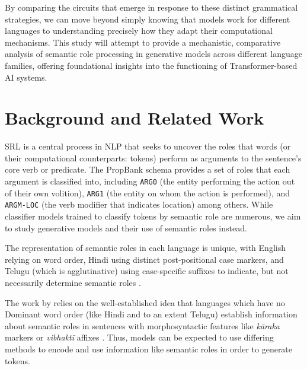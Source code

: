 \documentclass[11pt]{article}
\begin{document}
By comparing the circuits that emerge in response to these distinct grammatical strategies, we can move beyond simply knowing that models work for different languages to understanding precisely how they adapt their computational mechanisms. This study will attempt to provide a mechanistic, comparative analysis of semantic role processing in generative models across different language families, offering foundational insights into the functioning of Transformer-based AI systems.
\section*{Background and Related Work}
\label{sec:org4aa9f51}

SRL is a central process in NLP that seeks to uncover the roles that words (or their computational counterparts: tokens) perform as arguments to the sentence's core verb or predicate. The PropBank \citep{10.1162/0891201053630264} schema provides a set of roles that each argument is classified into, including \texttt{ARG0} (the entity performing the action out of their own volition), \texttt{ARG1} (the entity on whom the action is performed), and \texttt{ARGM-LOC} (the verb modifier that indicates location) among others. While classifier models trained to classify tokens by semantic role are numerous, we aim to study generative models and their use of semantic roles instead.

The representation of semantic roles in each language is unique, with English relying on word order, Hindi using distinct post-positional case markers, and Telugu (which is agglutinative) using case-specific suffixes to indicate, but not necessarily determine semantic roles \citep{vaidya-etal-2011-analysis}.

The work by \citet{ghosh.etal2024} relies on the well-established idea that languages which have no Dominant word order (like Hindi and to an extent Telugu) establish information about semantic roles in sentences with morphosyntactic features like \emph{kāraka} markers or \emph{vibhaktī} affixes \citep{vaidya-etal-2011-analysis}. Thus, models can be expected to use differing methods to encode and use information like semantic roles in order to generate tokens.
\end{document}

